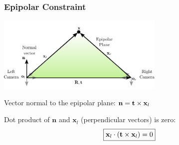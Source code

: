\begin{frame}
    \frametitle{Epipolar Constraint}
    \begin{center}
        \includegraphics[width=0.6\textwidth]{./images/epipolar_geometry_normal_vector.pdf}
    \end{center}

    Vector normal to the epipolar plane: $\mathbf{n} = \boldsymbol{\mathbf{t}} \times \mathbf{x}_l$

    Dot product of $\mathbf{n}$ and $\mathbf{x}_l$ (perpendicular vectors) is zero:
    $$\boxed{\mathbf{x}_l \cdot (\boldsymbol{\mathbf{t}} \times \mathbf{x}_l) = 0}$$
\end{frame}

